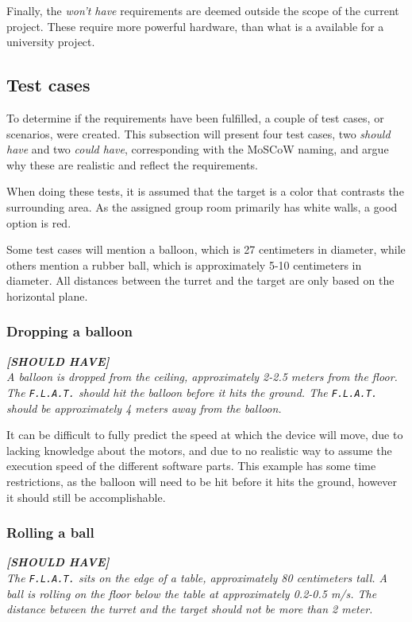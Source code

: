 Finally, the \textit{won't have} requirements are deemed outside the scope of the current project.
These require more powerful hardware, than what is a available for a university project.

\subsection{Test cases}
To determine if the requirements have been fulfilled, a couple of test cases, or scenarios, were created.
This subsection will present four test cases, two \textit{should have} and two \textit{could have}, corresponding with the MoSCoW naming, and argue why these are realistic and reflect the requirements.


When doing these tests, it is assumed that the target is a color that contrasts the surrounding area.
As the assigned group room primarily has white walls, a good option is red.


Some test cases will mention a balloon, which is 27 centimeters in diameter, while others mention a rubber ball, which is approximately 5-10 centimeters in diameter.
All distances between the turret and the target are only based on the horizontal plane.

\subsubsection{Dropping a balloon}
\textit{\textbf{[SHOULD HAVE]}}\\
\textit{A balloon is dropped from the ceiling, approximately 2-2.5 meters from the floor.
The \texttt{F.L.A.T.} should hit the balloon before it hits the ground.
The \texttt{F.L.A.T.} should be approximately 4 meters away from the balloon.}

It can be difficult to fully predict the speed at which the device will move, due to lacking knowledge about the motors, and due to no realistic way to assume the execution speed of the different software parts.
This example has some time restrictions, as the balloon will need to be hit before it hits the ground, however it should still be accomplishable.

\subsubsection{Rolling a ball}
\textit{\textbf{[SHOULD HAVE]}}\\
\textit{The \texttt{F.L.A.T.} sits on the edge of a table, approximately 80 centimeters tall.
A ball is rolling on the floor below the table at approximately 0.2-0.5 m/s.
The distance between the turret and the target should not be more than 2 meter.}


